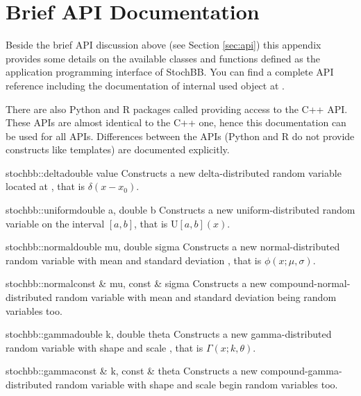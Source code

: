 \section{Brief API Documentation} \label{sec::apidoc}
Beside the brief API discussion above (see Section \ref{sec:api}) this appendix
provides some details on the available classes and  functions defined as the
application programming interface of StochBB. You can find a complete API
reference including the documentation of internal used object at \citep{stochbbapi}.

There are also Python and R packages called  providing access to the C++
API. These APIs are almost identical to the C++ one, hence this 
documentation can be used for all APIs. Differences between the APIs (Python and R
do not provide constructs like templates) are documented explicitly.

\begin{deffunc}{stochbb::delta}{}{double value}	
 Constructs a new delta-distributed random variable located at , that is $\delta(x-x_0)$.
\end{deffunc}

\begin{deffunc}{stochbb::uniform}{}{double a, double b}	
Constructs a new uniform-distributed random variable on the interval $[a,b]$, that is $\text{U}[a,b](x)$.
\end{deffunc}

\begin{deffunc}{stochbb::normal}{}{double mu, double sigma}
Constructs a new normal-distributed random variable with mean  and 
standard deviation  , that is $\phi(x;\mu, \sigma)$.
\end{deffunc}

\begin{deffunc*}{stochbb::normal}{}{const \& mu, const \& sigma}
Constructs a new compound-normal-distributed random variable with mean  and 
standard deviation  being random variables too.
\end{deffunc*}

\begin{deffunc}{stochbb::gamma}{}{double k, double theta}
Constructs a new gamma-distributed random variable with shape  and 
scale  , that is $\Gamma(x; k, \theta)$.
\end{deffunc}

\begin{deffunc*}{stochbb::gamma}{}{const \& k, const \& theta}
Constructs a new compound-gamma-distributed random variable with shape  and 
scale  begin random variables too.
\end{deffunc*}

